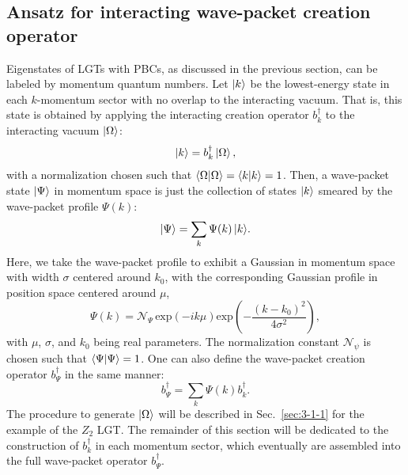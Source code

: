 \documentclass[a4paper,onecolumn,11pt,accepted=2024-10-11]{quantumarticle}
\begin{document}
\subsection{Ansatz for interacting wave-packet creation operator}
\label{sec:2-2}
Eigenstates of LGTs with PBCs, as discussed in the previous section, can be labeled by momentum quantum numbers. Let $\ket{k}$ be the lowest-energy state in each $k$-momentum sector with no overlap to the interacting vacuum. That is, this state is obtained by applying the interacting creation operator $b_k^\dagger$ to the interacting vacuum $\ket{\Omega}$:
%
\begin{equation}
    \ket{k} = b_k^\dagger\ket{\Omega},
    \label{eq:bk1}
\end{equation}
%
with a normalization chosen such that $\braket{\Omega|\Omega}=\braket{k|k}=1$. Then, a wave-packet state $\ket{\Psi}$ in momentum space is just the collection of states $\ket{k}$ smeared by the wave-packet profile $\Psi(k)$:
%
\begin{equation}
    \ket{\Psi} = \sum_k {\Psi(k) \ket{k}}. \label{eq:bk2}
\end{equation}
%
Here, we take the wave-packet profile to exhibit a Gaussian in momentum space with width $\sigma$ centered around $k_0$, with the corresponding Gaussian profile in position space centered around $\mu$,
%
\begin{equation}
    \Psi(k)=\mathcal{N}_\Psi \, \text{exp}\left(-ik\mu\right) \text{exp}\left(-\frac{(k-k_0)^2}{4{\sigma}^2}\right),
    \label{eq:Psi-def}
\end{equation}
%
with $\mu$, $\sigma$, and $k_0$ being real parameters. The normalization constant $\mathcal{N}_\psi$ is chosen such that $\braket{\Psi|\Psi}=1$.  One can also define the wave-packet creation operator $b_\Psi^\dagger$ in the same manner:
%
\begin{equation}
    b_{\Psi}^{\dagger} = \sum_k {\Psi(k) b_{k}^{\dagger}}.
    \label{eq:bk3}
\end{equation}
%
The procedure to generate $\ket{\Omega}$ will be described in Sec.~\ref{sec:3-1-1} for the example of the $Z_2$ LGT. The remainder of this section will be dedicated to the construction of $b_{k}^{\dagger}$ in each momentum sector, which eventually are assembled into the full wave-packet operator $b_{\Psi}^{\dagger}$.
\end{document}
